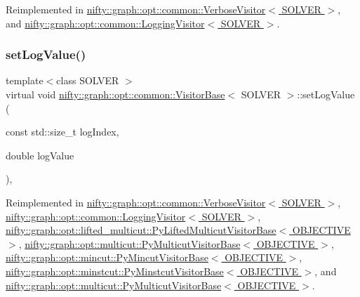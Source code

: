 Reimplemented in \hyperlink{classnifty_1_1graph_1_1opt_1_1common_1_1VerboseVisitor_abfb4175c92ce0c98eb3c214882cde62a}{nifty\+::graph\+::opt\+::common\+::\+Verbose\+Visitor$<$ S\+O\+L\+V\+E\+R $>$}, and \hyperlink{classnifty_1_1graph_1_1opt_1_1common_1_1LoggingVisitor_a516caf5c8a5c5378ef5d5d62d920142c}{nifty\+::graph\+::opt\+::common\+::\+Logging\+Visitor$<$ S\+O\+L\+V\+E\+R $>$}.

\mbox{\label{classnifty_1_1graph_1_1opt_1_1common_1_1VisitorBase_a41efc013731cca97176a61be58db0094}} 
\subsubsection{\texorpdfstring{set\+Log\+Value()}{setLogValue()}}
{\footnotesize\ttfamily template$<$class S\+O\+L\+V\+ER $>$ \\
virtual void \hyperlink{classnifty_1_1graph_1_1opt_1_1common_1_1VisitorBase}{nifty\+::graph\+::opt\+::common\+::\+Visitor\+Base}$<$ S\+O\+L\+V\+ER $>$\+::set\+Log\+Value (\begin{DoxyParamCaption}\item[{const std\+::size\+\_\+t}]{log\+Index,  }\item[{double}]{log\+Value }\end{DoxyParamCaption})\hspace{0.3cm}{\ttfamily [inline]}, {\ttfamily [virtual]}}



Reimplemented in \hyperlink{classnifty_1_1graph_1_1opt_1_1common_1_1VerboseVisitor_a4f01ae337ac5fedf5ad178c883cd0153}{nifty\+::graph\+::opt\+::common\+::\+Verbose\+Visitor$<$ S\+O\+L\+V\+E\+R $>$}, \hyperlink{classnifty_1_1graph_1_1opt_1_1common_1_1LoggingVisitor_a2e4db3bf347a0f6eae52d2b66c341935}{nifty\+::graph\+::opt\+::common\+::\+Logging\+Visitor$<$ S\+O\+L\+V\+E\+R $>$}, \hyperlink{classnifty_1_1graph_1_1opt_1_1lifted__multicut_1_1PyLiftedMulticutVisitorBase_a3b6820cf08c0cda2cd72fd5627ea8faa}{nifty\+::graph\+::opt\+::lifted\+\_\+multicut\+::\+Py\+Lifted\+Multicut\+Visitor\+Base$<$ O\+B\+J\+E\+C\+T\+I\+V\+E $>$}, \hyperlink{classnifty_1_1graph_1_1opt_1_1multicut_1_1PyMulticutVisitorBase_a7235408f664ec8fdc9e80f56b83424c4}{nifty\+::graph\+::opt\+::multicut\+::\+Py\+Multicut\+Visitor\+Base$<$ O\+B\+J\+E\+C\+T\+I\+V\+E $>$}, \hyperlink{classnifty_1_1graph_1_1opt_1_1mincut_1_1PyMincutVisitorBase_a3c2aa40745b7853704fee9a77625dc8d}{nifty\+::graph\+::opt\+::mincut\+::\+Py\+Mincut\+Visitor\+Base$<$ O\+B\+J\+E\+C\+T\+I\+V\+E $>$}, \hyperlink{classnifty_1_1graph_1_1opt_1_1minstcut_1_1PyMinstcutVisitorBase_a32ac765a4f9124c178450d5d5c865b49}{nifty\+::graph\+::opt\+::minstcut\+::\+Py\+Minstcut\+Visitor\+Base$<$ O\+B\+J\+E\+C\+T\+I\+V\+E $>$}, and \hyperlink{classnifty_1_1graph_1_1opt_1_1multicut_1_1PyMulticutVisitorBase_a7235408f664ec8fdc9e80f56b83424c4}{nifty\+::graph\+::opt\+::multicut\+::\+Py\+Multicut\+Visitor\+Base$<$ O\+B\+J\+E\+C\+T\+I\+V\+E $>$}.

